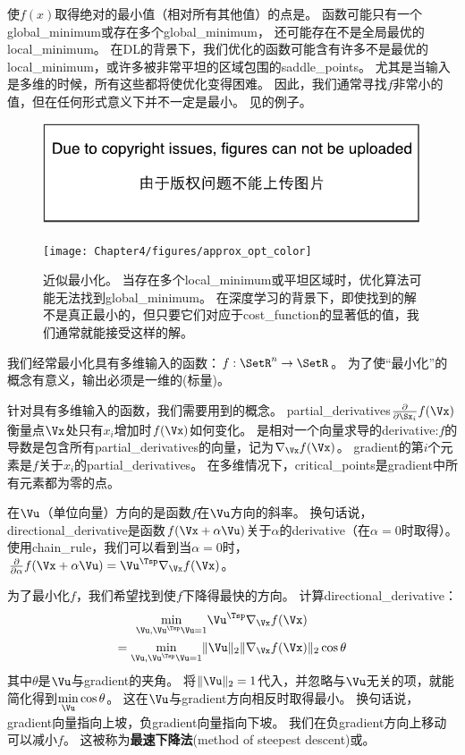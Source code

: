 使$f(x)$取得绝对的最小值（相对所有其他值）的点是。
函数可能只有一个\gls{global_minimum}或存在多个\gls{global_minimum}，
还可能存在不是全局最优的\gls{local_minimum}。
在\gls{DL}的背景下，我们优化的函数可能含有许多不是最优的\gls{local_minimum}，或许多被非常平坦的区域包围的\gls{saddle_points}。
尤其是当输入是多维的时候，所有这些都将使优化变得困难。
因此，我们通常寻找$f$非常小的值，但在任何形式意义下并不一定是最小。
见的例子。
\begin{figure}[!htb]
\ifOpenSource
\centerline{\includegraphics{figure.pdf}}
\else
\centerline{\texttt{[image: Chapter4/figures/approx\_opt\_color]}}
\fi
\caption{近似最小化。 
当存在多个\gls{local_minimum}或平坦区域时，优化算法可能无法找到\gls{global_minimum}。
在深度学习的背景下，即使找到的解不是真正最小的，但只要它们对应于\gls{cost_function}的显著低的值，我们通常就能接受这样的解。
}
\label{fig:chap4_approx_opt_color}
\end{figure}

我们经常最小化具有多维输入的函数：$f: \SetR^n \rightarrow \SetR $。 
为了使``最小化''的概念有意义，输出必须是一维的(标量)。


针对具有多维输入的函数，我们需要用到的概念。
\gls{partial_derivatives}$\frac{\partial}{\partial \Sx_i}f(\Vx)$衡量点$\Vx$处只有$x_i$增加时$f(\Vx)$如何变化。
是相对一个向量求导的\gls{derivative}:$f$的导数是包含所有\gls{partial_derivatives}的向量，记为$\nabla_{\Vx} f(\Vx)$。
\gls{gradient}的第$i$个元素是$f$关于$x_i$的\gls{partial_derivatives}。
在多维情况下，\gls{critical_points}是\gls{gradient}中所有元素都为零的点。

在$\Vu$（单位向量）方向的是函数$f$在$\Vu$方向的斜率。
换句话说，\gls{directional_derivative}是函数$f(\Vx + \alpha \Vu)$关于$\alpha$的\gls{derivative}（在$\alpha = 0$时取得）。
使用\gls{chain_rule}，我们可以看到当$\alpha=0$时，$\frac{\partial}{\partial \alpha} f(\Vx + \alpha \Vu) = \Vu^\Tsp \nabla_{\Vx} f(\Vx)$。

为了最小化$f$，我们希望找到使$f$下降得最快的方向。
计算\gls{directional_derivative}：
\begin{align}
 \underset{\Vu, \Vu^\Tsp\Vu = 1}{\min} \Vu^\Tsp & \nabla_{\Vx} f(\Vx) \\
 = \underset{\Vu, \Vu^\Tsp\Vu = 1}{\min} \| \Vu \|_2 \| &\nabla_{\Vx}f(\Vx) \|_2 \cos \theta
\end{align}
其中$\theta$是$\Vu$与\gls{gradient}的夹角。
将$ \| \Vu \|_2 = 1$代入，并忽略与$\Vu$无关的项，就能简化得到$ \underset{\Vu}{\min} \cos \theta $。 
这在$\Vu$与\gls{gradient}方向相反时取得最小。
换句话说，\gls{gradient}向量指向上坡，负\gls{gradient}向量指向下坡。
我们在负\gls{gradient}方向上移动可以减小$f$。
这被称为\textbf{最速下降法}(method of steepest descent)或。

